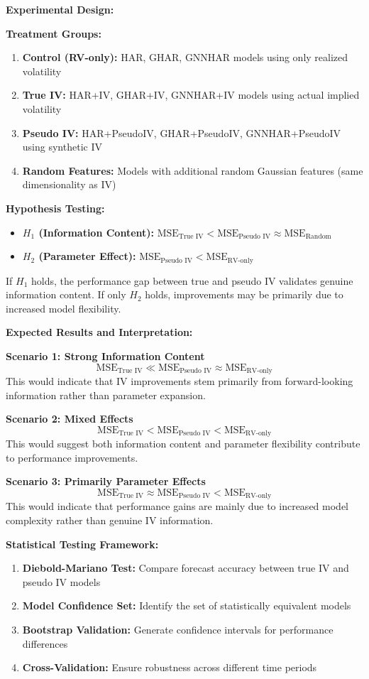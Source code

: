 \documentclass[12pt,a4paper]{article}
\begin{document}
\textbf{Experimental Design:}

\textbf{Treatment Groups:}
\begin{enumerate}
\item \textbf{Control (RV-only):} HAR, GHAR, GNNHAR models using only realized volatility
\item \textbf{True IV:} HAR+IV, GHAR+IV, GNNHAR+IV models using actual implied volatility
\item \textbf{Pseudo IV:} HAR+PseudoIV, GHAR+PseudoIV, GNNHAR+PseudoIV using synthetic IV
\item \textbf{Random Features:} Models with additional random Gaussian features (same dimensionality as IV)
\end{enumerate}

\textbf{Hypothesis Testing:}
\begin{itemize}
\item \textbf{$H_1$ (Information Content):} $\text{MSE}_{\text{True IV}} < \text{MSE}_{\text{Pseudo IV}} \approx \text{MSE}_{\text{Random}}$
\item \textbf{$H_2$ (Parameter Effect):} $\text{MSE}_{\text{Pseudo IV}} < \text{MSE}_{\text{RV-only}}$
\end{itemize}

If $H_1$ holds, the performance gap between true and pseudo IV validates genuine information content. If only $H_2$ holds, improvements may be primarily due to increased model flexibility.

\textbf{Expected Results and Interpretation:}

\textbf{Scenario 1: Strong Information Content}
$$\text{MSE}_{\text{True IV}} \ll \text{MSE}_{\text{Pseudo IV}} \approx \text{MSE}_{\text{RV-only}}$$
This would indicate that IV improvements stem primarily from forward-looking information rather than parameter expansion.

\textbf{Scenario 2: Mixed Effects}
$$\text{MSE}_{\text{True IV}} < \text{MSE}_{\text{Pseudo IV}} < \text{MSE}_{\text{RV-only}}$$
This would suggest both information content and parameter flexibility contribute to performance improvements.

\textbf{Scenario 3: Primarily Parameter Effects}
$$\text{MSE}_{\text{True IV}} \approx \text{MSE}_{\text{Pseudo IV}} < \text{MSE}_{\text{RV-only}}$$
This would indicate that performance gains are mainly due to increased model complexity rather than genuine IV information.

\textbf{Statistical Testing Framework:}
\begin{enumerate}
\item \textbf{Diebold-Mariano Test:} Compare forecast accuracy between true IV and pseudo IV models
\item \textbf{Model Confidence Set:} Identify the set of statistically equivalent models
\item \textbf{Bootstrap Validation:} Generate confidence intervals for performance differences
\item \textbf{Cross-Validation:} Ensure robustness across different time periods
\end{enumerate}
\end{document}

